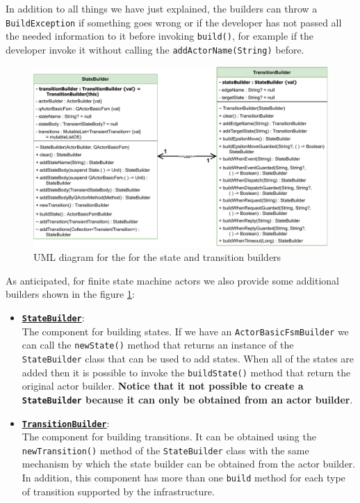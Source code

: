 In addition to all things we have just explained, the builders can throw a \texttt{BuildException} if something goes wrong or if the developer has not passed all the needed information to it before invoking \verb*|build()|, for example if the developer invoke it without calling the \verb*|addActorName(String)| before.

\begin{figure}[h!]
	\centering
	\includegraphics[width=\textwidth]{img/[UML]it.unibo.kaktor.builders_stateb_transitionb}
	\caption{UML diagram for the for the state and transition builders}
	\label{fig::builders_stateb_transitionb}
\end{figure}
As anticipated, for finite state machine actors we also provide some additional builders shown in the figure \ref{fig::builders_stateb_transitionb}:

\begin{itemize}
	\item 	\href{https://github.com/LM-96/QA-Extensions/blob/main/it.unibo.qakactor/src/main/kotlin/builders/StateBuilder.kt}{\underline{\textbf{\texttt{StateBuilder}}}}:\\
	The component for building states. If we have an \texttt{ActorBasicFsmBuilder} we can call the \verb*|newState()| method that returns an instance of the \texttt{StateBuilder} class that can be used to add states. When all of the states are added then it is possible to invoke the \texttt{buildState()} method that return the original actor builder. \textbf{Notice that it not possible to create a \texttt{StateBuilder} because it can only be obtained from an actor builder}.
	
	\item 	\href{https://github.com/LM-96/QA-Extensions/blob/main/it.unibo.qakactor/src/main/kotlin/builders/TransitionBuilder.kt}{\underline{\textbf{\texttt{TransitionBuilder}}}}:\\
	The component for building transitions. It can be obtained using the \verb*|newTransition()| method of the \texttt{StateBuilder} class with the same mechanism by which the state builder can be obtained from the actor builder. In addition, this component has more than one \texttt{build} method for each type of transition supported by the infrastructure.
\end{itemize}

